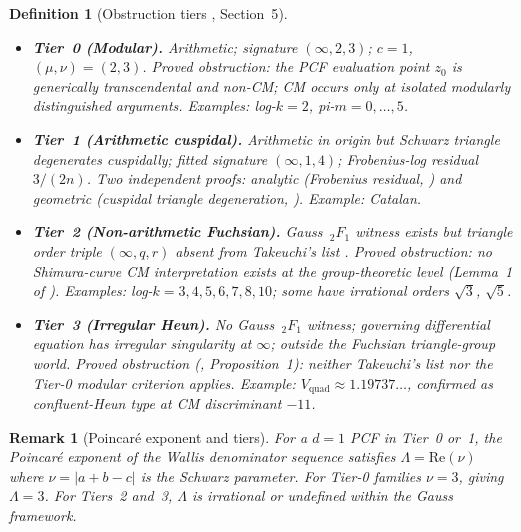 \documentclass[12pt]{amsart}
\newtheorem{definition}[theorem]{Definition}
\newtheorem{remark}[theorem]{Remark}
\begin{document}
\begin{definition}[Obstruction tiers
  {\cite{Obstruction}, Section~5}]
\label{def:tiers}
\begin{itemize}
\item \textbf{Tier~0 (Modular).}
  Arithmetic; signature $(\infty,2,3)$;
  $c=1$, $(\mu,\nu)=(2,3)$.
  Proved obstruction: the PCF evaluation point
  $z_0$ is generically transcendental and
  non-CM; CM occurs only at isolated modularly
  distinguished arguments.
  Examples: \textnormal{log-}$k=2$,
  \textnormal{pi-}$m=0,\ldots,5$.

\item \textbf{Tier~1 (Arithmetic cuspidal).}
  Arithmetic in origin but Schwarz triangle
  degenerates cuspidally; fitted signature
  $(\infty,1,4)$; Frobenius-log residual
  $3/(2n)$.
  Two independent proofs: analytic (Frobenius
  residual, \cite{Spectral}) and geometric
  (cuspidal triangle degeneration,
  \cite{Obstruction}).
  Example: Catalan.

\item \textbf{Tier~2 (Non-arithmetic Fuchsian).}
  Gauss $\,_2F_1$ witness exists but triangle
  order triple $(\infty,q,r)$ absent from
  Takeuchi's list \cite{Takeuchi}.
  Proved obstruction: no Shimura-curve CM
  interpretation exists at the group-theoretic
  level (Lemma~1 of \cite{Obstruction}).
  Examples: \textnormal{log-}$k=3,4,5,6,7,8,10$;
  some have irrational orders
  $\sqrt{3}$, $\sqrt{5}$.

\item \textbf{Tier~3 (Irregular Heun).}
  No Gauss $\,_2F_1$ witness; governing
  differential equation has irregular
  singularity at $\infty$; outside the
  Fuchsian triangle-group world.
  Proved obstruction (\cite{Obstruction},
  Proposition~1): neither Takeuchi's list
  nor the Tier-0 modular criterion applies.
  Example: $V_{\mathrm{quad}}\approx
  1.19737\ldots$, confirmed as confluent-Heun
  type at CM discriminant $-11$.
\end{itemize}
\end{definition}

\begin{remark}[Poincar\'e exponent and tiers]
For a $d=1$ PCF in Tier~0 or~1, the
Poincar\'e exponent of the Wallis denominator
sequence satisfies $\Lambda = \mathrm{Re}(\nu)$
where $\nu=|a+b-c|$ is the Schwarz parameter.
For Tier-0 families $\nu=3$, giving $\Lambda=3$.
For Tiers~2 and~3, $\Lambda$ is irrational or
undefined within the Gauss framework.
\end{remark}
\end{document}
